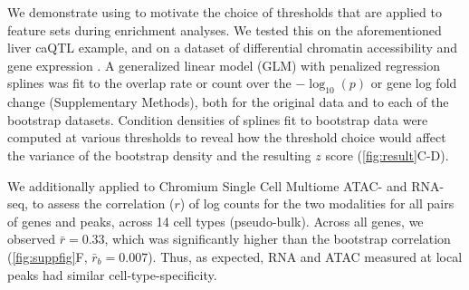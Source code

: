 We demonstrate using \bootranges to motivate the choice of thresholds 
that are applied to feature sets during enrichment analyses.
We tested this on the aforementioned liver caQTL example, and on a
dataset of differential chromatin accessibility and gene expression 
\citep{alasoo2018shared,lee2020fluent}.
A generalized linear model (GLM) with penalized regression splines was
fit to the overlap rate or count over the $-\log_{10}(p)$ or
gene log fold change (Supplementary Methods), both for the original
data and to each of the bootstrap datasets.
Condition densities of splines fit to bootstrap data
were computed at various thresholds to reveal how
the threshold choice would affect the
variance of the bootstrap density and the resulting $z$ score
(\cref{fig:result}C-D).

We additionally applied \bootranges to Chromium Single Cell Multiome
ATAC- and RNA-seq, to assess the correlation ($r$) of log counts for the two
modalities for all pairs of genes and peaks, across
14 cell types (pseudo-bulk). Across all genes, we observed
$\bar{r} = 0.33$, which was 
significantly higher than the bootstrap correlation
(\cref{fig:suppfig}F, $\bar{r}_{b} = 0.007$). Thus, as expected, RNA
and ATAC measured at local peaks had similar cell-type-specificity.


